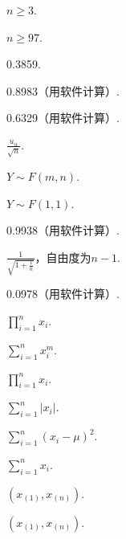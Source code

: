 \begin{answer}
  \item $n\ge3$.
  \item $n\ge97$.
  \item 0.3859.
  \item 0.8983（用软件计算）.
  \item 0.6329（用软件计算）.
  \item $\frac{u_{\alpha}}{\sqrt n}$.
  \setcounter{enumi}{7}
  \item $Y\sim F(m,n)$.
  \item $Y\sim F(1,1)$.
  \item 0.9938（用软件计算）.
  \setcounter{enumi}{11}
  \item $\frac1{\sqrt{1+\frac1n}}$，自由度为$n-1$.
  \item 0.0978（用软件计算）.
\end{answer}

\begin{answer}
  \setcounter{enumi}{4}
  \item $\prod_{i=1}^nx_i$.
  \item $\sum_{i=1}^nx_i^m$.
  \item $\prod_{i=1}^nx_i$.
  \item $\sum_{i=1}^n|x_i|$.
  \item \begin{enumerate*}
    \item $\sum_{i=1}^n(x_i-\mu)^2$.
    \item $\sum_{i=1}^nx_i$.
  \end{enumerate*}
  \item $(x_{(1)},x_{(n)})$.
  \item $(x_{(1)},x_{(n)})$.
\end{answer}

